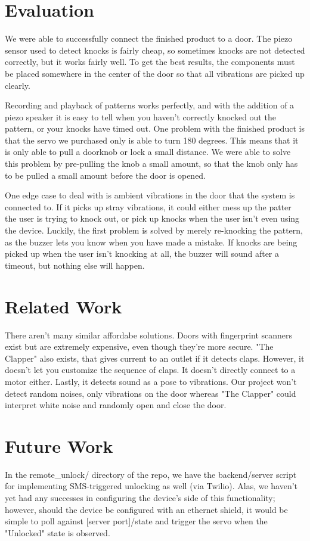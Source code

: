 \documentclass[11pt]{article}			%
\begin{document}
\section{Evaluation}
We were able to successfully connect the finished product to a door.  The piezo sensor used to detect knocks is fairly cheap, so sometimes knocks are not detected correctly, but it works fairly well.  To get the best results, the components must be placed somewhere in the center of the door so that all vibrations are picked up clearly.  

Recording and playback of patterns works perfectly, and with the addition of a piezo speaker it is easy to tell when you haven't correctly knocked out the pattern, or your knocks have timed out.  One problem with the finished product is that the servo we purchased only is able to turn 180 degrees.  This means that it is only able to pull a doorknob or lock a small distance.  We were able to solve this problem by pre-pulling the knob a small amount, so that the knob only has to be pulled a small amount before the door is opened.

One edge case to deal with is ambient vibrations in the door that the system is connected to.  If it picks up stray vibrations, it could either mess up the patter the user is trying to knock out, or pick up knocks when the user isn't even using the device.  Luckily, the first problem is solved by merely re-knocking the pattern, as the buzzer lets you know when you have made a mistake.  If knocks are being picked up when the user isn't knocking at all, the buzzer will sound after a timeout, but nothing else will happen.

\section{Related Work}
There aren't many similar affordabe solutions. Doors with fingerprint scanners exist but are extremely expensive, even though they're more secure. "The Clapper" also exists, that gives current to an outlet if it detects claps. However, it doesn't let you customize the sequence of claps. It doesn't directly connect to a motor either. Lastly, it detects sound as a pose to vibrations. Our project won't detect random noises, only vibrations on the door whereas "The Clapper" could interpret white noise and randomly open and close the door.

\section{Future Work}

In the remote\_unlock/ directory of the repo, we have the backend/server script for implementing SMS-triggered unlocking as well (via Twilio). Alas, we haven't yet had any successes in configuring the device's side of this functionality; however, should the device be configured with an ethernet shield, it would be simple to poll against [server port]/state and trigger the servo when the "Unlocked" state is observed.
\end{document}
